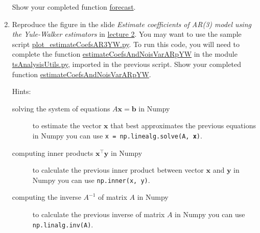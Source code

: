 \documentclass[12pt]{article}
\begin{document}
\begin{enumerate}
        Show your completed function
        \href{https://github.com/joacorapela/statNeuro2025/blob/6cfd79b15e698f4522eec97017f5471a4ff67633/worksheets/02\_temporalTimeSeriesAnalysis/tsAnalysisUtils.py\#L53}{forecast}.

    \item Reproduce the figure in the slide \emph{Estimate coefficients of
        AR(3) model using the Yule-Walker estimators} in
        \href{https://github.com/joacorapela/statNeuro2025/blob/master/lectures/02_temporalTimeSeriesAnalysis/temporalTimeSeriesAnalysis.pdf}{lecture 2}. You may want to use the
        sample script 
        \href{https://github.com/joacorapela/statNeuro2025/blob/master/worksheets/02_temporalTimeSeriesAnalysis/plot_estimateCoefsAR3YW.py}{plot\_estimateCoefsAR3YW.py}.
        To run this code, you will need to complete the function
        \href{https://github.com/joacorapela/statNeuro2025/blob/5c570ed3bbb4311d80c280fcb30c4a1ec26f5b53/worksheets/02_temporalTimeSeriesAnalysis/tsAnalysisUtils.py\#L28}{estimateCoefsAndNoisVarARpYW} in
        the module
        \href{https://github.com/joacorapela/statNeuro2025/blob/master/worksheets/02_temporalTimeSeriesAnalysis/tsAnalysisUtils.py\#L28}{tsAnalysisUtils.py},
        imported in the previous script.
        Show your completed function 
        \href{https://github.com/joacorapela/statNeuro2025/blob/5c570ed3bbb4311d80c280fcb30c4a1ec26f5b53/worksheets/02_temporalTimeSeriesAnalysis/tsAnalysisUtils.py\#L28}{estimateCoefsAndNoisVarARpYW}.

        Hints:

        \begin{description}

            \item[solving the system of equations $A\mathbf{x}=\mathbf{b}$ in
                Numpy] to estimate the vector $\mathbf{x}$ that best
                approximates the previous equations in Numpy you can use
                \texttt{x = np.linealg.solve(A, \textbf{x})}.

            \item[computing inner products $\mathbf{x}^\intercal\mathbf{y}$ in
                Numpy] to calculate the previous inner product between vector
                $\mathbf{x}$ and $\mathbf{y}$ in Numpy you can use
                \texttt{np.inner(x, y)}.

            \item[computing the inverse $A^{-1}$ of matrix $A$ in Numpy] to
                calculate the previous inverse of matrix $A$ in Numpy you can
                use \texttt{np.linalg.inv(A)}.

        \end{description}

\end{enumerate}
\end{document}
